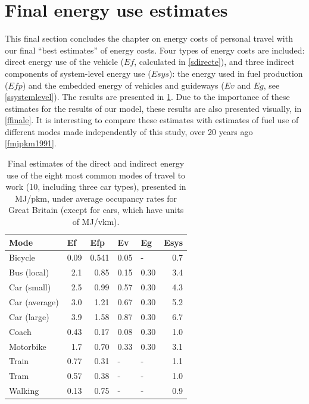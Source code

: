\section{Final energy use estimates} \label{sfinal} 
This final section concludes the chapter on energy costs of personal travel
with our final ``best estimates'' of energy costs. Four types of energy
costs are included: direct energy use of the vehicle ($Ef$, calculated
in \cref{sdirecte}), and three indirect components of system-level energy
use ($Esys$): the energy used in fuel production ($Efp$) and the embedded
energy of vehicles and guideways ($Ev$ and $Eg$, see \cref{ssystemlevel}).
The results are presented in \cref{tfinale}. Due to the importance of these
estimates for the results of our model, these results are also presented
visually, in \cref{ffinale}. It is interesting to compare these estimates
with estimates of fuel use of different modes made independently of this
study, over 20 years ago \cref{fmjpkm1991}.

\begin{table}[htbp]
\caption[Final estimates of the direct and indirect energy use of 8 modes]{Final
estimates of the direct and indirect energy use of the eight
most common modes of travel to work (10, including three car types),
presented in MJ/pkm, under average occupancy rates for Great Britain
(except for cars, which have units of MJ/vkm).}
\begin{center}
\begin{tabular}{lrrrrr}
\toprule
Mode & \multicolumn{1}{l}{Ef} & \multicolumn{1}{l}{Efp} & \multicolumn{1}{l}{Ev} & \multicolumn{1}{l}{Eg} & \multicolumn{1}{l}{Esys} \\
\midrule
Bicycle & 0.09 & 0.541 & 0.05 & \multicolumn{1}{l}{-} & 0.7 \\
Bus (local) & 2.1 & 0.85 & 0.15 & 0.30 & 3.4 \\
Car (small) & 2.5 & 0.99 & 0.57 & 0.30 & 4.3 \\
Car (average) & 3.0 & 1.21 & 0.67 & 0.30 & 5.2 \\
Car (large) & 3.9 & 1.58 & 0.87 & 0.30 & 6.7 \\
Coach & 0.43 & 0.17 & 0.08 & 0.30 & 1.0 \\
Motorbike & 1.7 & 0.70 & 0.33 & 0.30 & 3.1 \\
Train  & 0.77 & 0.31 & \multicolumn{1}{l}{-} & \multicolumn{1}{l}{-} & 1.1 \\
Tram & 0.57 & 0.38 & \multicolumn{1}{l}{-} & \multicolumn{1}{l}{-} & 1.0 \\
Walking & 0.13 & 0.75 & \multicolumn{1}{l}{-} & \multicolumn{1}{l}{-} & 0.9 \\ 
\bottomrule
\end{tabular}\end{center}
\label{tfinale}
\end{table}

